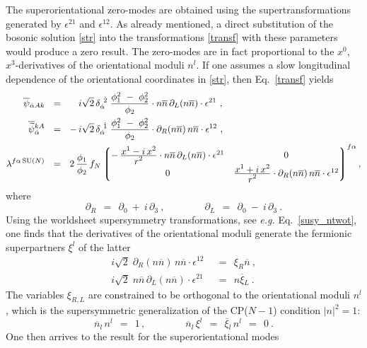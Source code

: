 \documentclass[12pt]{article}
\def\beq{\begin{equation}}
\def\eeq{\end{equation}}
\newcommand{\p}{\partial}
\newcommand{\wt}{\widetilde}
\newcommand{\ov}{\overline}
\newcommand{\lgr}{\left\lgroup}
\newcommand{\rgr}{\right\rgroup}
\newcommand{\bxil}{\ov{\xi}{}_L}
\newcommand{\nbar}{\ov{n}}
\begin{document}
	The superorientational zero-modes are obtained using the supertransformations generated by 
	$ \epsilon^{21} $ and $ \epsilon^{12} $.
	As already mentioned, a direct substitution of the bosonic solution \eqref{str} into the transformations
	\eqref{transf} with these parameters would produce a zero result.
	The zero-modes are in fact proportional to the $ x^0 $, $ x^3 $-derivatives of the orientational moduli $ n^l $.
	If one assumes a slow longitudinal dependence of the orientational coordinates in \eqref{str}, then Eq.~\eqref{transf}
	yields
\begin{align*}
%
	\ov{\psi}{}_{\dot{\alpha}Ak} & ~~=~~  \phantom{-\, } i\sqrt{2}\, \delta_{\dot{\alpha}}^{\ \dot{2}}\;
					\frac{\phi_1^2 ~-~ \phi_2^2}{\phi_2}\cdot n\nbar\, \p_L (n\nbar)\cdot \epsilon^{21}~,
	\\
%
	\ov{\wt{\psi}}{}_{\dot{\alpha}}^{kA} & ~~=~~ -\,  i\sqrt{2}\, \delta_{\dot{\alpha}}^{\ \dot{1}}\;
					\frac{\phi_1^2 ~-~ \phi_2^2}{\phi_2}\cdot \p_R (n\nbar)\, n\nbar\cdot \epsilon^{12}~,
	\\
%
	\lambda^{f\alpha\, \text{SU($N$)}} & ~~=~~ 
		2\, \frac{\phi_1}{\phi_2}\, f_N
	\lgr \begin{matrix}
			-\, \frac{\displaystyle x^1 - i\, x^2}{\displaystyle r^2}\cdot
				n\nbar\, \p_L(n\nbar)\cdot \epsilon^{21}                     &  0  \\
			0 &
			    \frac{\displaystyle x^1 + i\, x^2}{\displaystyle r^2}\cdot 
				\p_R (n\nbar)\, n\nbar\cdot \epsilon^{12}
	     \end{matrix} \rgr^{f\alpha},
\end{align*}	
	where
\[	
	\p_R ~~=~~ \p_0 ~+~ i\, \p_3 ~, \qquad\qquad  \p_L ~~=~~ \p_0 ~-~ i\, \p_3~.
\]
	Using the worldsheet supersymmetry transformations, see {\it e.g.} Eq.~\eqref{susy_ntwot}, one finds that 
	the derivatives of the orientational moduli generate the fermionic superpartners $ \xi^l $ of the latter
\begin{align*}
%
	i \sqrt{2}\; \p_R (n \nbar)\, n\nbar \cdot \epsilon^{12} & 
		~~=~~ \xi_R \nbar~,  \\
%
	i \sqrt{2}\; n\nbar\, \p_L (n\nbar) \cdot \epsilon^{21} & 
		~~=~~ n \bxil~.
\end{align*}
	The variables $ \xi_{R,L} $ are constrained to be orthogonal to the orientational moduli $ n^l $, which is the
	supersymmetric generalization of the CP($N-1$) condition $ |n|^2 = 1 $:
\beq
\label{constr}
	\nbar{}_l\, n^l ~~=~~ 1\,, \qquad\qquad    \nbar_l\, \xi^l  ~~=~~ \ov{\xi}{}_l\, n^l  ~~=~~ 0~.
\eeq
	One then arrives to the result for the superorientational modes
\end{document}
